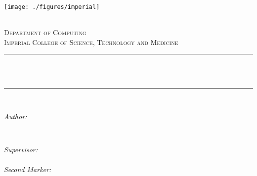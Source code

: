 \begin{titlepage}

    \newcommand{\HRule}{\rule{\linewidth}{0.5mm}} %
    
    
    \texttt{[image: ./figures/imperial]}\\[0.5cm] 
    
    \center %
     
    
    \textsc{\LARGE \reporttype}\\[1.5cm] 
    \textsc{\Large Department of Computing}\\[0.5cm] 
    \textsc{\large Imperial College of Science, Technology and Medicine}\\[0.5cm] 
    
    
    \HRule \\[0.4cm]
    { \huge \bfseries \reporttitle}\\ %
    \HRule \\[1.5cm]
     
    
    \begin{minipage}{0.4\textwidth}
    \begin{flushleft} \large
    \emph{Author:}\\
    \reportauthor %
    \end{flushleft}
    \end{minipage}
    ~
    \begin{minipage}{0.4\textwidth}
    \begin{flushright} \large
    \emph{Supervisor:} \\
    \supervisor \\ %
    \vspace{1em}
    \emph{Second Marker:} \\
    \secondMarker %
    \end{flushright}
    \end{minipage}\\[4cm]
    

\end{titlepage}
